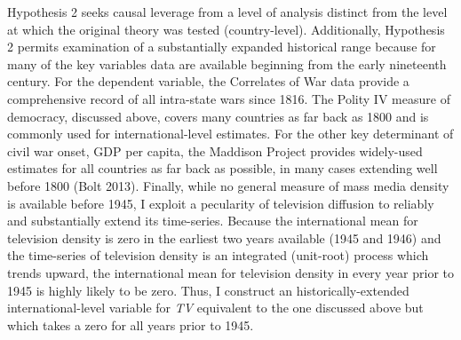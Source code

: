 \documentclass[12pt,article,oneside]{memoir}
\begin{document}
Hypothesis 2 seeks causal leverage from a level of analysis distinct
from the level at which the original theory was tested (country-level).
Additionally, Hypothesis 2 permits examination of a substantially
expanded historical range because for many of the key variables data are
available beginning from the early nineteenth century. For the dependent
variable, the Correlates of War data provide a comprehensive record of
all intra-state wars since 1816. The Polity IV measure of democracy,
discussed above, covers many countries as far back as 1800 and is
commonly used for international-level estimates. For the other key
determinant of civil war onset, GDP per capita, the Maddison Project
provides widely-used estimates for all countries as far back as
possible, in many cases extending well before 1800 (Bolt 2013). Finally,
while no general measure of mass media density is available before 1945,
I exploit a pecularity of television diffusion to reliably and
substantially extend its time-series. Because the international mean for
television density is zero in the earliest two years available (1945 and
1946) and the time-series of television density is an integrated
(unit-root) process which trends upward, the international mean for
television density in every year prior to 1945 is highly likely to be
zero. Thus, I construct an historically-extended international-level
variable for \emph{TV} equivalent to the one discussed above but which
takes a zero for all years prior to 1945.
\end{document}
